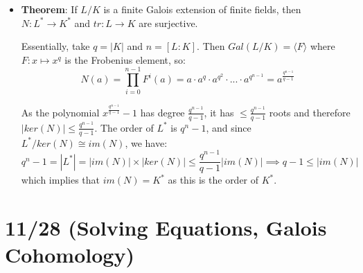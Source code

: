 \documentclass[11pt, oneside]{amsart}   	%
\theoremstyle{definition}
\begin{document}
\begin{itemize}
	\item \textbf{Theorem}: If $L / K$ is a finite Galois extension of finite fields, then $N : L^*\rightarrow K^*$ and $tr : L\rightarrow K$ are surjective.
	
	Essentially, take $q = |K|$ and $n =[L : K]$. Then $Gal(L / K) = \langle F\rangle$ where $F : x\mapsto x^q$ is the Frobenius element, so:
	$$
		N(a) = \prod_{i = 0}^{n - 1}F^i(a) = a\cdot a^q\cdot a^{q^2}\cdot...\cdot a^{q^{n - 1}} = a^{\frac{q^{n - 1}}{q - 1}}
	$$
	
	As the polynomial $x^{\frac{q^{n - 1}}{q - 1}} - 1$ has degree $\frac{q^{n - 1}}{q - 1}$, it has $\leq \frac{q^{n - 1}}{q - 1}$ roots and therefore $|ker(N)| 
	\leq \frac{q^{n - 1}}{q - 1}$. The order of $L^*$ is $q^n - 1$, and since $L^* / ker(N)\cong im(N)$, we have:
	$$
		q^n - 1 = |L^*| = |im(N)|\times |ker(N)| \leq \frac{q^{n - 1}}{q - 1}|im(N)|\implies q - 1\leq |im(N)|
	$$
	which implies that $im(N) = K^*$ as this is the order of $K^*$. 

\end{itemize}

\section{11/28 (Solving Equations, Galois Cohomology)}
\end{document}
